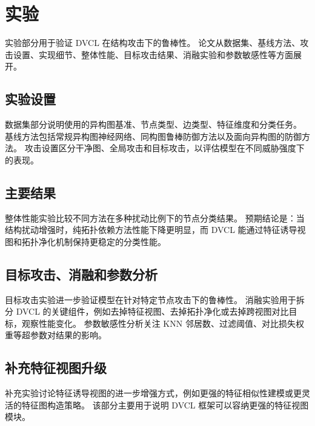 \section{实验}
\label{sec:experiments-zh}

实验部分用于验证 DVCL 在结构攻击下的鲁棒性。
论文从数据集、基线方法、攻击设置、实现细节、整体性能、目标攻击结果、消融实验和参数敏感性等方面展开。

\subsection{实验设置}

数据集部分说明使用的异构图基准、节点类型、边类型、特征维度和分类任务。
基线方法包括常规异构图神经网络、同构图鲁棒防御方法以及面向异构图的防御方法。
攻击设置区分干净图、全局攻击和目标攻击，以评估模型在不同威胁强度下的表现。

\subsection{主要结果}

整体性能实验比较不同方法在多种扰动比例下的节点分类结果。
预期结论是：当结构扰动增强时，纯拓扑依赖方法性能下降更明显，而 DVCL 能通过特征诱导视图和拓扑净化机制保持更稳定的分类性能。

\subsection{目标攻击、消融和参数分析}

目标攻击实验进一步验证模型在针对特定节点攻击下的鲁棒性。
消融实验用于拆分 DVCL 的关键组件，例如去掉特征视图、去掉拓扑净化或去掉跨视图对比目标，观察性能变化。
参数敏感性分析关注 KNN 邻居数、过滤阈值、对比损失权重等超参数对结果的影响。

\subsection{补充特征视图升级}

补充实验讨论特征诱导视图的进一步增强方式，例如更强的特征相似性建模或更灵活的特征图构造策略。
该部分主要用于说明 DVCL 框架可以容纳更强的特征视图模块。
